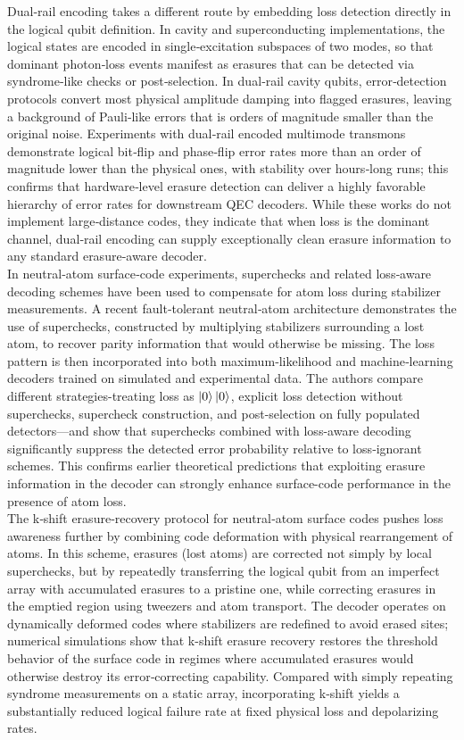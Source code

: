 \documentclass{article}
\begin{document}
Dual‑rail encoding takes a different route by embedding loss detection directly in the logical qubit definition. 
In cavity and superconducting implementations, the logical states are encoded in single‑excitation subspaces of two modes, so that dominant photon‑loss events manifest as erasures that can be detected via syndrome‑like checks or post‑selection. 
In dual‑rail cavity qubits, error‑detection protocols convert most physical amplitude damping into flagged erasures, leaving a background of Pauli‑like errors that is orders of magnitude smaller than the original noise. 
Experiments with dual‑rail encoded multimode transmons demonstrate logical bit‑flip and phase‑flip error rates more than an order of magnitude lower than the physical ones, with stability over hours‑long runs; this confirms that hardware‑level erasure detection can deliver a highly favorable hierarchy of error rates for downstream QEC decoders. 
While these works do not implement large‑distance codes, they indicate that when loss is the dominant channel, dual‑rail encoding can supply exceptionally clean erasure information to any standard erasure‑aware decoder.\\

In neutral‑atom surface‑code experiments, superchecks and related loss‑aware decoding schemes have been used to compensate for atom loss during stabilizer measurements. 
A recent fault‑tolerant neutral‑atom architecture demonstrates the use of superchecks, constructed by multiplying stabilizers surrounding a lost atom, to recover parity information that would otherwise be missing.
The loss pattern is then incorporated into both maximum‑likelihood and machine‑learning decoders trained on simulated and experimental data.
The authors compare different strategies-treating loss as $\ket{0}\ket{0}$, explicit loss detection without superchecks, supercheck construction, and post-selection on fully populated detectors—and show that superchecks combined with loss-aware decoding significantly suppress the detected error probability relative to loss‑ignorant schemes.
This confirms earlier theoretical predictions that exploiting erasure information in the decoder can strongly enhance surface-code performance in the presence of atom loss.\\

The k‑shift erasure‑recovery protocol for neutral‑atom surface codes pushes loss awareness further by combining code deformation with physical rearrangement of atoms. 
In this scheme, erasures (lost atoms) are corrected not simply by local superchecks, but by repeatedly transferring the logical qubit from an imperfect array with accumulated erasures to a pristine one, while correcting erasures in the emptied region using tweezers and atom transport. 
The decoder operates on dynamically deformed codes where stabilizers are redefined to avoid erased sites; numerical simulations show that k-shift erasure recovery restores the threshold behavior of the surface code in regimes where accumulated erasures would otherwise destroy its error‑correcting capability. 
Compared with simply repeating syndrome measurements on a static array, incorporating k-shift yields a substantially reduced logical failure rate at fixed physical loss and depolarizing rates.\\
\end{document}
